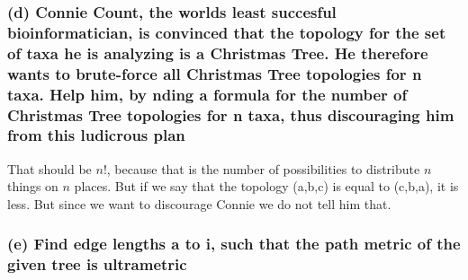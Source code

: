 \subsubsection*{(d) Connie Count, the worlds least succesful bioinformatician, is convinced that the topology for the
set of taxa he is analyzing is a Christmas Tree. He therefore wants to brute-force all Christmas
Tree topologies for n taxa. Help him, by nding a formula for the number of Christmas Tree topologies for n taxa, thus discouraging
him from this ludicrous plan}

That should be $n!$, because that is the number of possibilities to distribute $n$ things on $n$ places. But if we say that the topology (a,b,c) is equal to (c,b,a), it is less. But since we want to discourage Connie we do not tell him that.  

\subsubsection*{(e) Find edge lengths a to i, such that the path metric of the given tree is ultrametric}


\begin{figure}[H]
    \centering
\end{figure}


